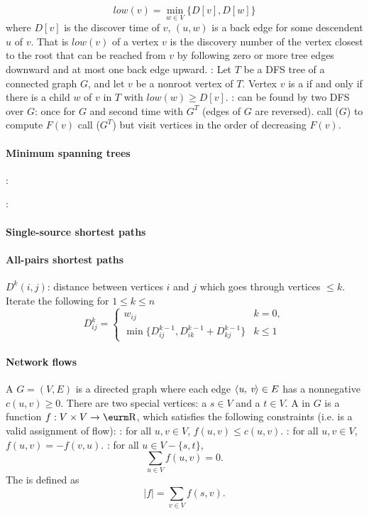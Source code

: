 \documentclass{myproc}
\begin{document}
   \[ low(v) = \min_{w \in V}\{D[v], D[w]\} \]
   where $D[v]$ is the discover time of $v$, 
    $(u, w)$ is a back edge for some descendent $u$ of $v$.
   That is $low(v)$ of a vertex $v$ is the discovery number of the vertex
   closest to the root that can be reached from $v$  by following zero or more
   tree edges downward and at most one back edge upward.
\w {}: Let $T$ be a DFS tree of a connected graph $G$, and let $v$
be a nonroot vertex of $T$. Vertex $v$ is a  if and only if
there is a child $w$ of $v$ in $T$ with $low(w) \ge D[v]$.
\w {}: can be found by two DFS over $G$: once for $G$
and second time with $G^T$ (edges of $G$ are reversed).
  \ben
  \w [(a)] call ($G$) to compute  $F(v)$
  \w [(b)] call ($G^T$) but visit vertices in the order of decreasing $F(v)$.
  \een
\eit

\paragraph{Minimum spanning trees}
\bit
\w {}:

\w {}:
\eit

\paragraph{Single-source shortest paths}

\paragraph{All-pairs shortest paths}
\bit
\w $D^k(i, j)$: distance between vertices $i$ and $j$ which goes through
vertices $\le k$.
\w Iterate the following for $1 \le k \le n$
\[ D^k_{ij} = \left\{\begin{array}{ll}
   w_{ij}  & k = 0, \\ 
   \min\{D^{k-1}_{ij},  D^{k-1}_{ik}  + D^{k-1}_{kj}\} & k \le 1
\end{array} \right.\]
\eit


\paragraph{Network flows}
\bit
\w A  $G = (V, E)$ is a directed graph where each edge
$\mbox{$\langle{\textit{u, v}}\rangle$} \in E$ has a nonnegative  $c(u, v) \ge 0$.
There are two special vertices: a  $s \in V$ and a  $t \in
V$. 
\w A  in $G$ is a function $f: V \times V \rightarrow \R$, which
satisfies the following constraints (i.e. is a valid assignment of flow):
  \ben
  \w {}: for all $u, v \in V$, $f(u, v) \le c(u, v)$.
  \w {}: for all $u, v \in V$, $f(u, v) = - f(v, u)$.
  \w {}: for all $u \in V - \{s, t\}$, 
     \[ \sum_{u \in V} f(u, v) = 0.\]
  \een
\w The  is defined as
   \[ |f| = \sum_{v \in V} f(s, v).\]
\eit




\nocite{Harary69}
\end{document}
